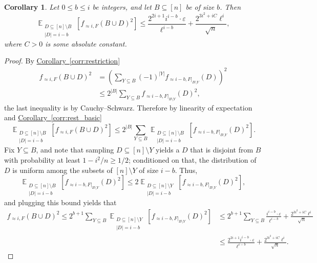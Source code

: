 \documentclass[11pt]{article}
\newcommand{\expref}[2]{\texorpdfstring{\hyperref[#2]{#1~\ref{#2}}}{#1~\ref{#2}}}
\newtheorem{corollary}[theorem]{Corollary}
\newcommand\card[1]{\left| {#1} \right|}
\newcommand\Expect[2]{{\mathop{\mathbb{E}}_{#1}\left[ {#2} \right]}}
\newcommand\eps{\varepsilon}
\renewcommand\geq{\geqslant}
\renewcommand\leq{\leqslant}
\newcommand\approxlvlfn[2]{{#1}_{\approx{#2}}}
\begin{document}
\begin{corollary}\label{corr:rest_norm}
Let $0\leq b\leq i$ be integers, and let $B\subseteq [n]$ be of size $b$. Then
\[
\Expect{\substack{D\subseteq [n]\setminus B \\ \card{D} = i-b}}{\approxlvlfn{f}{i, F}(B\cup D)^2}
\leq \frac{2^{2i+1}i^{i-b}\cdot \eps }{\ell^{i-b}}
+\frac{2^{3i^2+iC} \ell^{i}}{\sqrt{n}},
\]
where $C>0$ is some absolute constant.
\end{corollary}
\begin{proof}
By \expref{Corollary}{corr:restriction}
\begin{align*}
\approxlvlfn{f}{i, F}(B\cup D)^2
&=\left(\sum\limits_{Y\subseteq B}{(-1)^{\card{Y}} \approxlvlfn{f}{i-b, F|_{B\setminus Y}}(D)}\right)^2\\
&\leq 2^{\card{B}} \sum\limits_{Y\subseteq B}{\approxlvlfn{f}{i-b, F|_{B\setminus Y}}(D)^2},
\end{align*}
the last inequality is by Cauchy--Schwarz. Therefore by linearity of expectation and \expref{Corollary}{corr:rest_basic}
\[
\Expect{\substack{D\subseteq [n]\setminus B \\ \card{D} = i-b}}{\approxlvlfn{f}{i, F}(B\cup D)^2}
\leq
2^{\card{B}}
\sum\limits_{Y\subseteq B}{
\Expect{\substack{D\subseteq [n]\setminus B \\ \card{D} = i-b}}{\approxlvlfn{f}{i-b, F|_{B\setminus Y}}(D)^2}}.
\]
Fix $Y\subseteq B$, and note that sampling $D\subseteq [n]\setminus Y$ yields a $D$ that is disjoint from $B$
with probability at least $1- i^2/n \geq 1/2$; conditioned on that, the distribution of $D$ is uniform among
the subsets of $[n]\setminus Y$ of size $i-b$. Thus,
\[
\Expect{\substack{D\subseteq [n]\setminus B \\ \card{D} = i-b}}{\approxlvlfn{f}{i-b, F|_{B\setminus Y}}(D)^2}
\leq
2
\Expect{\substack{D\subseteq [n]\setminus Y \\ \card{D} = i-b}}{\approxlvlfn{f}{i-b, F|_{B\setminus Y}}(D)^2},
\]
and plugging this bound yields that
\begin{align*}
\approxlvlfn{f}{i, F}(B\cup D)^2
\leq
2^{b+1}
\sum\limits_{Y\subseteq B}{
\Expect{\substack{D\subseteq [n]\setminus Y \\ \card{D} = i-b}}{\approxlvlfn{f}{i-b, F|_{B\setminus Y}}(D)^2}}
&\leq 2^{b+1}
\sum\limits_{Y\subseteq B}
\frac{i^{i-b}\cdot \eps }{\ell^{i-b}} + \frac{2^{3i^2+iC} \ell^{i}}{\sqrt{n}}\\
&\leq \frac{2^{2i+1}i^{i-b}\cdot\eps }{\ell^{i-b}}
+\frac{2^{3i^2+iC} \ell^{i}}{\sqrt{n}}.
\end{align*}
\end{proof}
\end{document}
